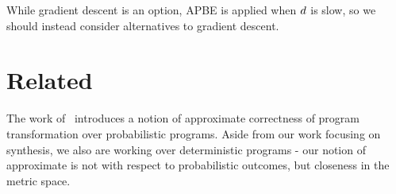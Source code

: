 While gradient descent is an option, APBE is applied when ${d}$ is slow, so we should instead consider alternatives to gradient descent.


\section{Related}

The work of~\cite{misailovic2011probabilistically} introduces a notion of approximate correctness of program transformation over probabilistic programs.
Aside from our work focusing on synthesis, we also are working over deterministic programs - our notion of approximate is not with respect to probabilistic outcomes, but closeness in the metric space.

